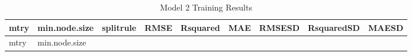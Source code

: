 \documentclass[
]{article}
\begin{document}
\begin{longtable}[]{@{}
  >{\raggedleft\arraybackslash}p{}
  >{\raggedleft\arraybackslash}p{}
  >{\raggedright\arraybackslash}p{}
  >{\raggedleft\arraybackslash}p{}
  >{\raggedleft\arraybackslash}p{}
  >{\raggedleft\arraybackslash}p{}
  >{\raggedleft\arraybackslash}p{}
  >{\raggedleft\arraybackslash}p{}
  >{\raggedleft\arraybackslash}p{}@{}}
\caption{Model 2 Training Results}\tabularnewline
\toprule\noalign{}
\begin{minipage}[b]{\linewidth}\raggedleft
mtry
\end{minipage} & \begin{minipage}[b]{\linewidth}\raggedleft
min.node.size
\end{minipage} & \begin{minipage}[b]{\linewidth}\raggedright
splitrule
\end{minipage} & \begin{minipage}[b]{\linewidth}\raggedleft
RMSE
\end{minipage} & \begin{minipage}[b]{\linewidth}\raggedleft
Rsquared
\end{minipage} & \begin{minipage}[b]{\linewidth}\raggedleft
MAE
\end{minipage} & \begin{minipage}[b]{\linewidth}\raggedleft
RMSESD
\end{minipage} & \begin{minipage}[b]{\linewidth}\raggedleft
RsquaredSD
\end{minipage} & \begin{minipage}[b]{\linewidth}\raggedleft
MAESD
\end{minipage} \\
\midrule\noalign{}
\endfirsthead
\toprule\noalign{}
\begin{minipage}[b]{\linewidth}\raggedleft
mtry
\end{minipage} & \begin{minipage}[b]{\linewidth}\raggedleft
min.node.size
\end{minipage} & \begin{minipage}[b]{\linewidth}\raggedright

\end{minipage}
\end{longtable}
\end{document}
